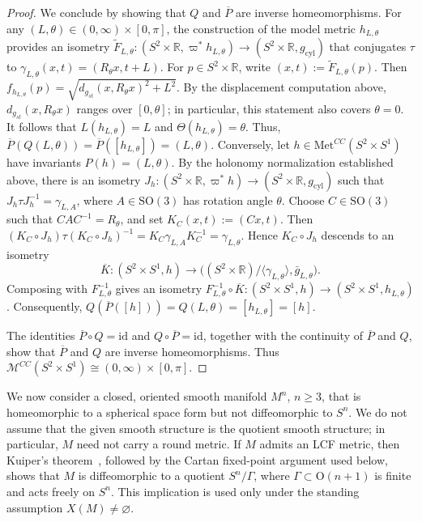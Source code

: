 \documentclass[12pt,oneside,a4paper]{article}
\theoremstyle{mytheorem}
\theoremstyle{remark}
\theoremstyle{definition}
\begin{document}
\begin{proof}
We conclude by showing that $Q$ and $\overline P$ are inverse homeomorphisms.
For any $(L,\theta)\in(0,\infty)\times[0,\pi]$, the construction of the
model metric $h_{L,\theta}$ provides an isometry
\(\widetilde F_{L,\theta}\colon
(S^2\times\mathbb R,\varpi^*h_{L,\theta})
\to (S^2\times\mathbb R,g_{\mathrm{cyl}})\)
that conjugates $\tau$ to
$\gamma_{L,\theta}(x,t)=(R_\theta x,t+L)$. For
$p\in S^2\times\mathbb R$, write
\(
(x,t):=\widetilde F_{L,\theta}(p).
\)
Then
\(f_{h_{L,\theta}}(p)
=\sqrt{d_{g_{st}}(x,R_\theta x)^2+L^2}\).
By the displacement computation above,
$d_{g_{st}}(x,R_\theta x)$ ranges over $[0,\theta]$; in particular, this
statement also covers $\theta=0$. It follows that
$L(h_{L,\theta})=L$ and $\Theta(h_{L,\theta})=\theta$. Thus,
\(\overline P(Q(L, \theta)) = \overline P([h_{L, \theta}]) = (L, \theta)\).
Conversely, let $h\in\mathrm{Met}^{CC}(S^2\times S^1)$ have invariants
$P(h)=(L,\theta)$. By the holonomy normalization established above, there is
an isometry
\(J_h\colon(S^2\times\mathbb R,\varpi^*h)
\to (S^2\times\mathbb R,g_{\mathrm{cyl}})\)
such that $J_h\tau J_h^{-1}=\gamma_{L,A}$, where $A\in\mathrm{SO}(3)$
has rotation angle $\theta$. Choose $C\in\mathrm{SO}(3)$ such that
$CAC^{-1}=R_\theta$, and set $K_C(x,t):=(Cx,t)$. Then
\((K_C\circ J_h)\tau(K_C\circ J_h)^{-1}
=K_C\gamma_{L,A}K_C^{-1}=\gamma_{L,\theta}\).
Hence $K_C\circ J_h$ descends to an isometry
\[
\overline K\colon
(S^2\times S^1,h)
\longrightarrow
\bigl((S^2\times\mathbb R)/\langle\gamma_{L,\theta}\rangle,
\bar g_{L,\theta}\bigr).
\]
Composing with $F_{L,\theta}^{-1}$ gives an isometry
\(F_{L,\theta}^{-1}\circ\overline K\colon
(S^2\times S^1,h)
\to (S^2\times S^1,h_{L,\theta})\).
Consequently,
\(Q(\overline P([h]))=Q(L,\theta)=[h_{L,\theta}]=[h]\).

The identities $\overline P\circ Q=\mathrm{id}$ and
$Q\circ\overline P=\mathrm{id}$, together with the continuity of $\overline P$
and $Q$,
show that $\overline P$ and $Q$ are inverse homeomorphisms. Thus
\(\mathcal{M}^{CC}(S^2\times S^1)\cong(0,\infty)\times[0,\pi]\).
\end{proof}

We now consider a closed, oriented smooth manifold $M^n$, $n\geq3$, that is
homeomorphic to a spherical space form but not diffeomorphic to $S^n$. We do
not assume that the given smooth structure is the quotient smooth structure;
in particular, $M$ need not carry a round metric. If $M$ admits an LCF metric,
then Kuiper's theorem~\cite{zbMATH03061883}, followed by the Cartan
fixed-point argument used below, shows that $M$ is diffeomorphic to a quotient
$S^n/\Gamma$, where $\Gamma\subset\mathrm{O}(n+1)$ is finite and acts freely
on $S^n$. This implication is used only under the standing assumption
$X(M)\neq\varnothing$.
\end{document}
